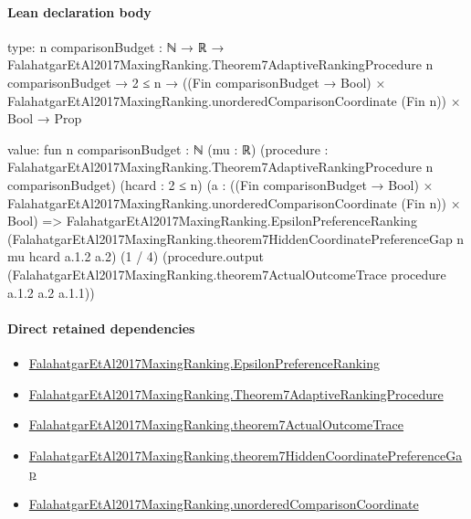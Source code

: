 \documentclass[10pt]{article}
\begin{document}
\paragraph{Lean declaration body}
\begin{ReviewVerbatim}
type:
{n comparisonBudget : ℕ} →
  ℝ →
    FalahatgarEtAl2017MaxingRanking.Theorem7AdaptiveRankingProcedure n comparisonBudget →
      2 ≤ n →
        ((Fin comparisonBudget → Bool) × FalahatgarEtAl2017MaxingRanking.unorderedComparisonCoordinate (Fin n)) × Bool →
          Prop

value:
fun {n comparisonBudget : ℕ} (mu : ℝ)
    (procedure : FalahatgarEtAl2017MaxingRanking.Theorem7AdaptiveRankingProcedure n comparisonBudget) (hcard : 2 ≤ n)
    (a :
      ((Fin comparisonBudget → Bool) × FalahatgarEtAl2017MaxingRanking.unorderedComparisonCoordinate (Fin n)) × Bool) =>
  FalahatgarEtAl2017MaxingRanking.EpsilonPreferenceRanking
    (FalahatgarEtAl2017MaxingRanking.theorem7HiddenCoordinatePreferenceGap n mu hcard a.1.2 a.2) (1 / 4)
    (procedure.output (FalahatgarEtAl2017MaxingRanking.theorem7ActualOutcomeTrace procedure a.1.2 a.2 a.1.1))
\end{ReviewVerbatim}

\paragraph{Direct retained dependencies}
\begin{itemize}\raggedright
\item \hyperlink{paper-prerequisite-4d3d96fb13998c50}{Falahatgar\allowbreak{}Et\allowbreak{}Al2017\allowbreak{}Maxing\allowbreak{}Ranking.\allowbreak{}Epsilon\allowbreak{}Preference\allowbreak{}Ranking}
\item \hyperlink{governing-declaration-3610c7209777157b}{Falahatgar\allowbreak{}Et\allowbreak{}Al2017\allowbreak{}Maxing\allowbreak{}Ranking.\allowbreak{}Theorem7\allowbreak{}Adaptive\allowbreak{}Ranking\allowbreak{}Procedure}
\item \hyperlink{governing-declaration-1ca481c2b761867d}{Falahatgar\allowbreak{}Et\allowbreak{}Al2017\allowbreak{}Maxing\allowbreak{}Ranking.\allowbreak{}theorem7\allowbreak{}Actual\allowbreak{}Outcome\allowbreak{}Trace}
\item \hyperlink{governing-declaration-9f44e1631e55511f}{Falahatgar\allowbreak{}Et\allowbreak{}Al2017\allowbreak{}Maxing\allowbreak{}Ranking.\allowbreak{}theorem7\allowbreak{}Hidden\allowbreak{}Coordinate\allowbreak{}Preference\allowbreak{}Gap}
\item \hyperlink{governing-declaration-ef3a9f7f7c488790}{Falahatgar\allowbreak{}Et\allowbreak{}Al2017\allowbreak{}Maxing\allowbreak{}Ranking.\allowbreak{}unordered\allowbreak{}Comparison\allowbreak{}Coordinate}
\end{itemize}
\hypertarget{governing-declaration-31c043b1e1d258ed}{}
\end{document}
